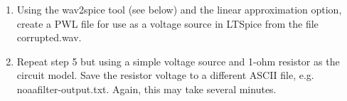\documentclass{article}
\begin{document}
\begin{enumerate}
\begin{center}
    \end{center}
    \newpage
    \item Using the wav2spice tool (see below) and the linear approximation option, create a PWL file for use as a voltage source in LTSpice from the file corrupted.wav.
    \begin{center}
    \end{center}
    \item Repeat step 5 but using a simple voltage source and 1-ohm resistor as the circuit model. Save the resistor voltage to a different ASCII file, e.g. noaafilter-output.txt. Again, this may take several minutes.
    \begin{center}
    \end{center}

\end{enumerate}
\end{document}

